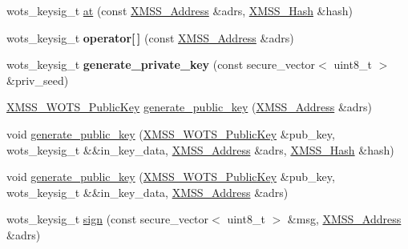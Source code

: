 \begin{DoxyCompactItemize}
wots\+\_\+keysig\+\_\+t \mbox{\hyperlink{class_botan_1_1_x_m_s_s___w_o_t_s___private_key_a5d454383924b5d2613cbce18417a9808}{at}} (const \mbox{\hyperlink{class_botan_1_1_x_m_s_s___address}{X\+M\+S\+S\+\_\+\+Address}} \&adrs, \mbox{\hyperlink{class_botan_1_1_x_m_s_s___hash}{X\+M\+S\+S\+\_\+\+Hash}} \&hash)
\item 
\mbox{\label{class_botan_1_1_x_m_s_s___w_o_t_s___private_key_a8799a8fe53357143f60fbf33febe52bb}} 
wots\+\_\+keysig\+\_\+t {\bfseries operator\mbox{[}$\,$\mbox{]}} (const \mbox{\hyperlink{class_botan_1_1_x_m_s_s___address}{X\+M\+S\+S\+\_\+\+Address}} \&adrs)
\item 
\mbox{\label{class_botan_1_1_x_m_s_s___w_o_t_s___private_key_a120bf39f319ad35112dadf5ff718754c}} 
wots\+\_\+keysig\+\_\+t {\bfseries generate\+\_\+private\+\_\+key} (const secure\+\_\+vector$<$ uint8\+\_\+t $>$ \&priv\+\_\+seed)
\item 
\mbox{\hyperlink{class_botan_1_1_x_m_s_s___w_o_t_s___public_key}{X\+M\+S\+S\+\_\+\+W\+O\+T\+S\+\_\+\+Public\+Key}} \mbox{\hyperlink{class_botan_1_1_x_m_s_s___w_o_t_s___private_key_a6557ddafc4e18ce4750c8a69b843481d}{generate\+\_\+public\+\_\+key}} (\mbox{\hyperlink{class_botan_1_1_x_m_s_s___address}{X\+M\+S\+S\+\_\+\+Address}} \&adrs)
\item 
void \mbox{\hyperlink{class_botan_1_1_x_m_s_s___w_o_t_s___private_key_a0d0695d108fd991536679070d88e4ea1}{generate\+\_\+public\+\_\+key}} (\mbox{\hyperlink{class_botan_1_1_x_m_s_s___w_o_t_s___public_key}{X\+M\+S\+S\+\_\+\+W\+O\+T\+S\+\_\+\+Public\+Key}} \&pub\+\_\+key, wots\+\_\+keysig\+\_\+t \&\&in\+\_\+key\+\_\+data, \mbox{\hyperlink{class_botan_1_1_x_m_s_s___address}{X\+M\+S\+S\+\_\+\+Address}} \&adrs, \mbox{\hyperlink{class_botan_1_1_x_m_s_s___hash}{X\+M\+S\+S\+\_\+\+Hash}} \&hash)
\item 
void \mbox{\hyperlink{class_botan_1_1_x_m_s_s___w_o_t_s___private_key_ac792421464c8da1e5587f1267b588d87}{generate\+\_\+public\+\_\+key}} (\mbox{\hyperlink{class_botan_1_1_x_m_s_s___w_o_t_s___public_key}{X\+M\+S\+S\+\_\+\+W\+O\+T\+S\+\_\+\+Public\+Key}} \&pub\+\_\+key, wots\+\_\+keysig\+\_\+t \&\&in\+\_\+key\+\_\+data, \mbox{\hyperlink{class_botan_1_1_x_m_s_s___address}{X\+M\+S\+S\+\_\+\+Address}} \&adrs)
\item 
wots\+\_\+keysig\+\_\+t \mbox{\hyperlink{class_botan_1_1_x_m_s_s___w_o_t_s___private_key_a8a392d55b4494010566455cf12c37e6c}{sign}} (const secure\+\_\+vector$<$ uint8\+\_\+t $>$ \&msg, \mbox{\hyperlink{class_botan_1_1_x_m_s_s___address}{X\+M\+S\+S\+\_\+\+Address}} \&adrs)

\end{DoxyCompactItemize}
